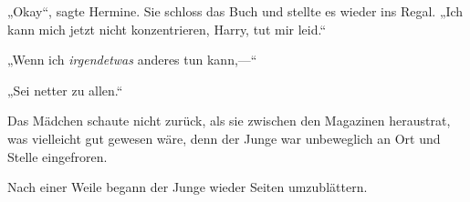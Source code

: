 „Okay“, sagte Hermine. Sie schloss das Buch und stellte es wieder ins Regal. „Ich kann mich jetzt nicht konzentrieren, Harry, tut mir leid.“

„Wenn ich \emph{irgendetwas} anderes tun kann,—“

„Sei netter zu allen.“

Das Mädchen schaute nicht zurück, als sie zwischen den Magazinen heraustrat, was vielleicht gut gewesen wäre, denn der Junge war unbeweglich an Ort und Stelle eingefroren.

Nach einer Weile begann der Junge wieder Seiten umzublättern.

